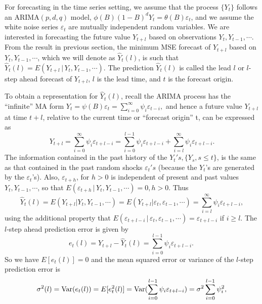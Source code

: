 For forecasting in the time series setting, we assume that the process $\{Y_t\}$ follows an ARIMA$(p,d,q)$ model, $\phi(B)(1 - B)^dY_t = \theta(B)\varepsilon_t$, and we assume the white noise series $\varepsilon_t$ are mutually independent random variables. We are interested in forecasting the future value $Y_{t+l}$ based on observations $Y_t,Y_{t-1},\cdots$. From the result in previous section, the minimum MSE forecast of $Y_{t+l}$ based on $Y_t,Y_{t-1},\cdots$, which we will denote as $\hat{Y}_t(l)$, is such that $\hat{Y}_t(l) = E(Y_{t+l}\,|\,Y_t,Y_{t-1},\cdots)$. The prediction $\hat{Y}_t(l)$ is called the lead $l$ or $l$-step ahead forecast of $Y_{t+l}$, $l$ is the lead time, and $t$ is the forecast origin.


To obtain a representation for $\hat{Y}_t(l)$, recall the ARIMA process has the ``infinite'' MA form $Y_t = \psi(B)\varepsilon_t = \sum_{i=0}^{\infty}\psi_i\varepsilon_{t-i},$ and hence a future value $Y_{t+l}$ at time $t+l$, relative to the current time or ``forecast origin'' t, can be expressed as
	\begin{equation}\label{eqn:2ytl}
	Y_{t+l} = \sum_{i=0}^\infty\psi_i\varepsilon_{t+l-i} = \sum_{i=0}^{l-1}\psi_i\varepsilon_{t+l-i} + \sum_{i=l}^\infty\psi_i\varepsilon_{t+l-i}.
	\end{equation}
The information contained in the past history of the $Y_t's, \{Y_s, s \leq t\}$, is the same as that contained in the past random shocks $\varepsilon_t's$ (because the $Y_t$'s are generated by the $\varepsilon_t$'s). Also, $\varepsilon_{t+h}$, for $h > 0$ is independent of present and past values $Y_{t},Y_{t-1},\cdots$, so that $E(\varepsilon_{t+h}\,|\,Y_t,Y_{t-1},\cdots) = 0, h>0$. Thus
	\begin{equation}\label{eqn:2yhatt}
	\hat{Y}_t(l) = E(Y_{t+l}|Y_t,Y_{t-1},\cdots) = E(Y_{t+l}|\varepsilon_t,\varepsilon_{t-1},\cdots) = \sum_{i=l}^\infty\psi_i\varepsilon_{t+l-i},
	\end{equation}
using the additional property that $E(\varepsilon_{t+l-i}\,|\,\varepsilon_t,\varepsilon_{t-1},\cdots) = \varepsilon_{t+l-i}$ if $i \geq l$. The $l$-step ahead prediction error is given by
	\[
	e_t(l) = Y_{t+l} - \hat{Y}_t(l) = \sum_{i=0}^{l-1}\psi_i\varepsilon_{t+l-i}.\
	\]
So we have $E[e_t(l)]=0$ and the mean squared error or variance of the $l$-step prediction error is
	\begin{equation}\label{eqn:2sigmasq}
\sigma^2(l) = \Var(e_t(l)) = E[e_t^2(l)] = \Var(\sum_{i=0}^{l-1}\psi_i\varepsilon_{t+l-i}) = \sigma^2\sum_{i=0}^{l-1}\psi_i^2,
	\end{equation}
